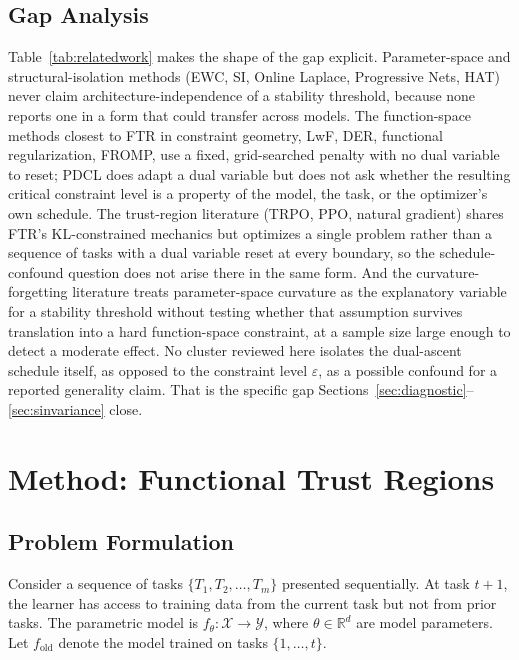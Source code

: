 \documentclass[11pt]{article}
\newcommand{\R}{\mathbb{R}}
\newcommand{\eps}{\varepsilon}
\begin{document}
\subsection{Gap Analysis}
\label{sec:gap}
Table~\ref{tab:relatedwork} makes the shape of the gap explicit. Parameter-space
and structural-isolation methods (EWC, SI, Online Laplace, Progressive Nets,
HAT) never claim architecture-independence of a stability threshold, because
none reports one in a form that could transfer across models. The
function-space methods closest to FTR in constraint geometry, LwF, DER,
functional regularization, FROMP, use a fixed, grid-searched penalty with no
dual variable to reset; PDCL does adapt a dual variable but does not ask
whether the resulting critical constraint level is a property of the model,
the task, or the optimizer's own schedule. The trust-region literature
(TRPO, PPO, natural gradient) shares FTR's KL-constrained mechanics but
optimizes a single problem rather than a sequence of tasks with a dual
variable reset at every boundary, so the schedule-confound question does
not arise there in the same form. And the curvature-forgetting literature
treats parameter-space curvature as the explanatory variable for a stability
threshold without testing whether that assumption survives translation into
a hard function-space constraint, at a sample size large enough to detect a
moderate effect. No cluster reviewed here isolates the dual-ascent schedule
itself, as opposed to the constraint level $\eps$, as a possible confound
for a reported generality claim. That is the specific gap
Sections~\ref{sec:diagnostic}--\ref{sec:sinvariance} close.

\section{Method: Functional Trust Regions}
\label{sec:method}

\subsection{Problem Formulation}
Consider a sequence of tasks $\{T_1, T_2, \ldots, T_m\}$ presented
sequentially. At task $t+1$, the learner has access to training data from the
current task but not from prior tasks. The parametric model is
$f_\theta: \mathcal{X} \to \mathcal{Y}$, where $\theta \in \R^d$ are model
parameters. Let $f_{\mathrm{old}}$ denote the model trained on tasks
$\{1,\ldots,t\}$.
\end{document}
